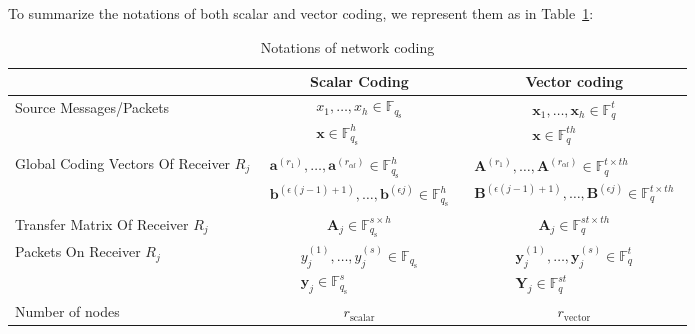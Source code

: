 To summarize the notations of both scalar and vector coding, we represent
them as in Table~\ref{tab:notations}:
\begin{table}[H]
\caption{Notations of network coding \label{tab:notations}}

\centering{}%
\begin{tabular}{|>{\centering}p{0.2\paperwidth}|c|c|}
\hline 
 & Scalar Coding & Vector coding\tabularnewline
\hline 
\hline 
Source Messages/Packets & $\begin{array}{c}
x_{1},\ldots,x_{h}\in\ensuremath{\mathbb{F}}_{q_{\mathrm{s}}}\\
\boldsymbol{x}\in\ensuremath{\mathbb{F}}_{q_{\mathrm{s}}}^{h}
\end{array}$ & $\begin{array}{c}
\boldsymbol{x}_{1},\ldots,\boldsymbol{x}_{h}\in\ensuremath{\mathbb{F}}_{q}^{t}\\
\boldsymbol{x}\in\ensuremath{\mathbb{F}}_{q}^{th}
\end{array}$\tabularnewline
\hline 
Global Coding Vectors Of Receiver $R_{j}$ & $\begin{array}{c}
\boldsymbol{a}^{\left(r_{1}\right)},\ldots,\boldsymbol{a}^{\left(r_{\alpha l}\right)}\in\ensuremath{\mathbb{F}}_{q_{\mathrm{s}}}^{h}\\
\boldsymbol{b}^{\left(\epsilon\left(j-1\right)+1\right)},\ldots,\boldsymbol{b}^{\left(\epsilon j\right)}\in\ensuremath{\mathbb{F}}_{q_{\mathrm{s}}}^{h}
\end{array}$ & $\begin{array}{c}
\boldsymbol{A}^{\left(r_{1}\right)},\ldots,\boldsymbol{A}^{\left(r_{\alpha l}\right)}\in\ensuremath{\mathbb{F}}_{q}^{t\times th}\\
\boldsymbol{B}^{\left(\epsilon\left(j-1\right)+1\right)},\ldots,\boldsymbol{B}^{\left(\epsilon j\right)}\in\ensuremath{\mathbb{F}}_{q}^{t\times th}
\end{array}$\tabularnewline
\hline 
Transfer Matrix Of Receiver $R_{j}$ & $\boldsymbol{A}_{j}\in\ensuremath{\mathbb{F}}_{q_{\mathrm{s}}}^{s\times h}$ & $\boldsymbol{A}_{j}\in\ensuremath{\mathbb{F}}_{q}^{st\times th}$\tabularnewline
\hline 
Packets On Receiver $R_{j}$ & $\begin{array}{c}
y_{j}^{\left(1\right)},\ldots,y_{j}^{\left(s\right)}\in\ensuremath{\mathbb{F}}_{q_{\mathrm{s}}}\\
\boldsymbol{y}_{j}\in\ensuremath{\mathbb{F}}_{q_{\mathrm{s}}}^{s}
\end{array}$ & $\begin{array}{c}
\boldsymbol{y}_{j}^{\left(1\right)},\ldots,\boldsymbol{y}_{j}^{\left(s\right)}\in\ensuremath{\mathbb{F}}_{q}^{t}\\
\boldsymbol{Y}_{j}\in\ensuremath{\mathbb{F}}_{q}^{st}
\end{array}$\tabularnewline
\hline 
Number of nodes & $r_{\mathrm{scalar}}$ & $r_{\mathrm{vector}}$\tabularnewline
\hline 
\end{tabular}
\end{table}

